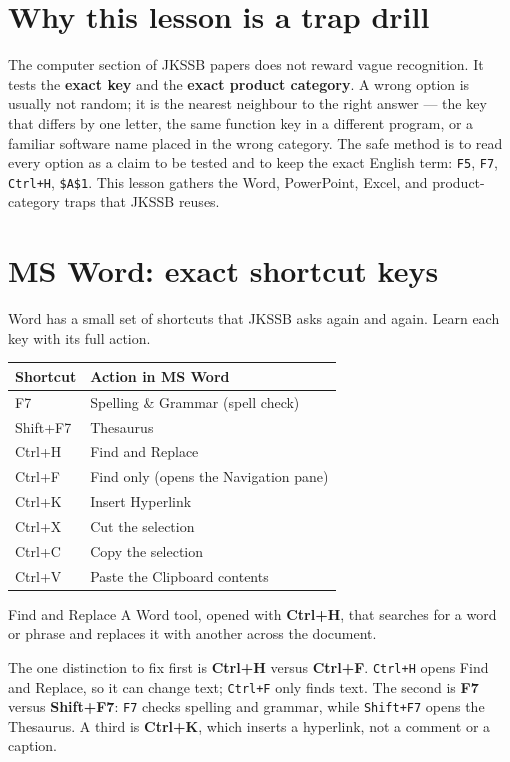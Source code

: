 \section{Why this lesson is a trap drill}
The computer section of JKSSB papers does not reward vague recognition. It
tests the \textbf{exact key} and the \textbf{exact product category}. A wrong
option is usually not random; it is the nearest neighbour to the right answer
--- the key that differs by one letter, the same function key in a different
program, or a familiar software name placed in the wrong category. The safe
method is to read every option as a claim to be tested and to keep the exact
English term: \texttt{F5}, \texttt{F7}, \texttt{Ctrl+H}, \texttt{\$A\$1}.
This lesson gathers the Word, PowerPoint, Excel, and product-category traps
that JKSSB reuses.

\section{MS Word: exact shortcut keys}
Word has a small set of shortcuts that JKSSB asks again and again. Learn each
key with its full action.

\begin{center}
\begin{tabular}{p{}p{}}
\toprule
\textbf{Shortcut} & \textbf{Action in MS Word} \\
\midrule
F7 & Spelling \& Grammar (spell check) \\
Shift+F7 & Thesaurus \\
Ctrl+H & Find and Replace \\
Ctrl+F & Find only (opens the Navigation pane) \\
Ctrl+K & Insert Hyperlink \\
Ctrl+X & Cut the selection \\
Ctrl+C & Copy the selection \\
Ctrl+V & Paste the Clipboard contents \\
\bottomrule
\end{tabular}
\end{center}

\begin{definitionbox}{Find and Replace}
A Word tool, opened with \textbf{Ctrl+H}, that searches for a word or phrase
and replaces it with another across the document.
\end{definitionbox}

The one distinction to fix first is \textbf{Ctrl+H} versus \textbf{Ctrl+F}.
\texttt{Ctrl+H} opens Find and Replace, so it can change text;
\texttt{Ctrl+F} only finds text. The second is \textbf{F7} versus
\textbf{Shift+F7}: \texttt{F7} checks spelling and grammar, while
\texttt{Shift+F7} opens the Thesaurus. A third is \textbf{Ctrl+K}, which
inserts a hyperlink, not a comment or a caption.


